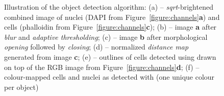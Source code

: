 \begin{figure}
\vspace*{.1in}
\begin{center}
\end{center}
\caption{\label{figure:analysis}
Illustration of the object detection algorithm: (a) -- {\em sqrt}-brightened combined image of nuclei (DAPI from Figure~\ref{figure:channels}{\bf a}) and cells (phalloidin from Figure~\ref{figure:channels}{\bf c}); (b) -- image {\bf a} after {\em blur} and {\em adaptive thresholding}; (c) -- image {\bf b} after morphological {\em opening} followed by {\em closing}; (d) -- normalized {\em distance map} generated from image {\bf c}; (e) -- outlines of cells detected using  drawn on top of the RGB image from Figure~\ref{figure:channels}{\bf d}; (f) -- colour-mapped cells and nuclei as detected with  (one unique colour per object)
}
\end{figure}

